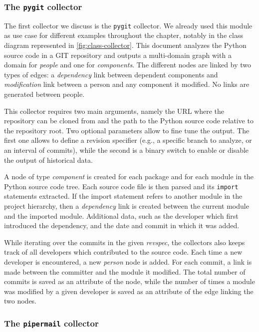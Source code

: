 \subsubsection{The \texttt{pygit} collector}

The first collector we discuss is the \texttt{pygit} collector. We already used this module as use case for different examples throughout the chapter, notably in the class diagram represented in \vref{fig:class-collector}. This document analyzes the Python source code in a GIT repository and outputs a multi-domain graph with a domain for \emph{people} and one for \emph{components}. The different nodes are linked by two types of edges: a \emph{dependency} link between dependent components and \emph{modification} link between a person and any component it modified. No links are generated between people.

This collector requires two main arguments, namely the URL where the repository can be cloned from and the path to the Python source code relative to the repository root. Two optional parameters allow to fine tune the output. The first one allows to define a revision specifier (e.g., a specific branch to analyze, or an interval of commits), while the second is a binary switch to enable or disable the output of historical data.

A node of type \emph{component} is created for each package and for each module in the Python source code tree. Each source code file is then parsed and its \texttt{import} statements extracted. If the import statement refers to another module in the project hierarchy, then a \emph{dependency} link is created between the current module and the imported module. Additional data, such as the developer which first introduced the dependency, and the date and commit in which it was added.

While iterating over the commits in the given \emph{revspec}, the collectors also keeps track of all developers which contributed to the source code. Each time a new developer is encountered, a new \emph{person} node is added. For each commit, a link is made between the committer and the module it modified. The total number of commits is saved as an attribute of the node, while the number of times a module was modified by a given developer is saved as an attribute of the edge linking the two nodes.

\subsubsection{The \texttt{pipermail} collector}

